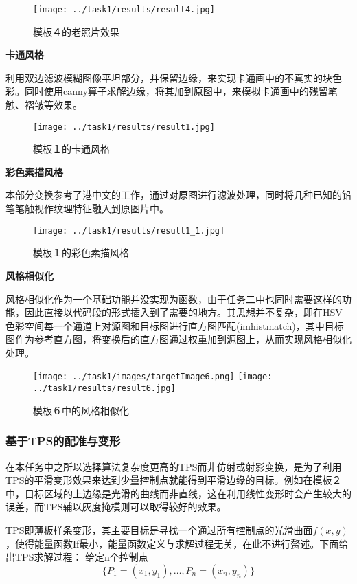 \documentclass[UTF8]{ctexart}
\begin{document}
\begin{figure}[H]
    \centering
    \texttt{[image: ../task1/results/result4.jpg]}
    \caption{模板４的老照片效果}
\end{figure}

\noindent\textbf{卡通风格}

利用双边滤波模糊图像平坦部分，并保留边缘，来实现卡通画中的不真实的块色彩。同时使用canny算子求解边缘，将其加到原图中，来模拟卡通画中的残留笔触、褶皱等效果。
\begin{figure}[H]
    \centering
    \texttt{[image: ../task1/results/result1.jpg]}
    \caption{模板１的卡通风格}
\end{figure}

\noindent\textbf{彩色素描风格}

本部分变换参考了港中文的工作\cite{ref2}，通过对原图进行滤波处理，同时将几种已知的铅笔笔触视作纹理特征融入到原图片中。
\begin{figure}[H]
    \centering
    \texttt{[image: ../task1/results/result1\_1.jpg]}
    \caption{模板１的彩色素描风格}
\end{figure}

\noindent\textbf{风格相似化}

风格相似化作为一个基础功能并没实现为函数，由于任务二中也同时需要这样的功能，因此直接以代码段的形式插入到了需要的地方。其思想并不复杂，即在HSV色彩空间每一个通道上对源图和目标图进行直方图匹配(imhistmatch)，其中目标图作为参考直方图，将变换后的直方图通过权重加到源图上，从而实现风格相似化处理。
\begin{figure}[H]
    \centering    \texttt{[image: ../task1/images/targetImage6.png]}
    \texttt{[image: ../task1/results/result6.jpg]}
    \caption{模板６中的风格相似化}
\end{figure}

\subsubsection{基于TPS的配准与变形}
在本任务中之所以选择算法复杂度更高的TPS而非仿射或射影变换，是为了利用TPS的平滑变形效果来达到少量控制点就能得到平滑边缘的目标。例如在模板２中，目标区域的上边缘是光滑的曲线而非直线，这在利用线性变形时会产生较大的误差，而TPS辅以灰度掩模则可以取得较好的效果。

TPS即薄板样条变形，其主要目标是寻找一个通过所有控制点的光滑曲面$f(x,y)$，使得能量函数If最小，能量函数定义与求解过程无关，在此不进行赘述。下面给出TPS求解过程：
给定n个控制点$$\{P_1=(x_1,y_1),\dots,P_n=(x_n,y_n)\}$$
\end{document}
